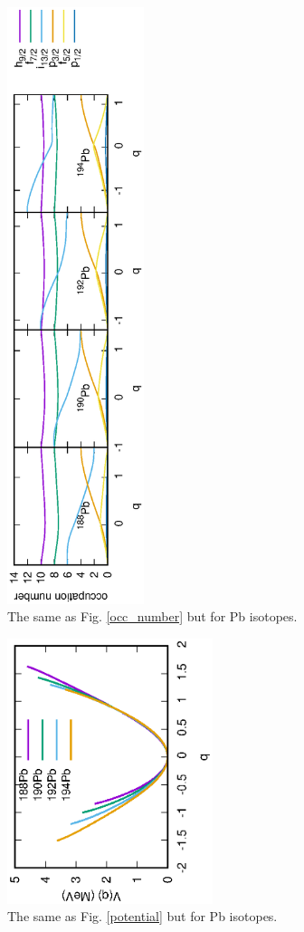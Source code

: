 \documentclass[%
superscriptaddress,
showpacs,
nofootinbib,
amsmath,amssymb,
aps,
prc,
twocolumn,
floatfix ]%
{revtex4-1}
\begin{document}
\begin{figure}[t]
 \begin{center}
  \includegraphics[width=40mm,angle=-90]{Pbocc_number.eps}
 \end{center}
	\caption{The same as Fig. \ref{occ_number} but for Pb isotopes.
}
 \label{Pb_occ_number}
\end{figure}
\begin{figure}[htbp]
 \begin{center}
  \includegraphics[width=60mm,angle=-90]{Pbpotential.eps}
 \end{center}
	\caption{The same as Fig. \ref{potential} but for Pb isotopes.
}
 \label{Pb_potential}
\end{figure}
\end{document}
